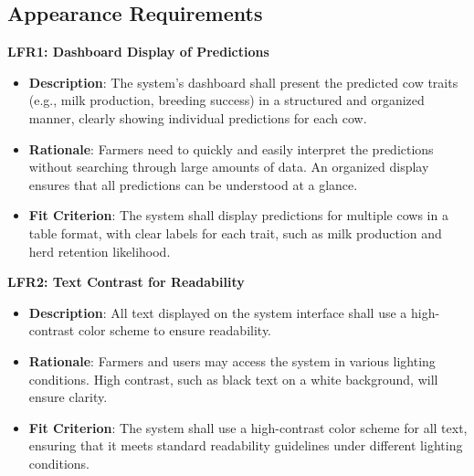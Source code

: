 \documentclass[12pt]{article}
\begin{document}
\subsection{Appearance Requirements}
\textbf{LFR1: Dashboard Display of Predictions}
\begin{itemize}
    \item \textbf{Description}: The system's dashboard shall present the 
    predicted cow traits (e.g., milk production, breeding success) in a 
    structured and organized manner, clearly showing individual predictions 
    for each cow.
    \item \textbf{Rationale}: Farmers need to quickly and easily interpret the 
    predictions without searching through large amounts of data. An organized 
    display ensures that all predictions can be understood at a glance.
    \item \textbf{Fit Criterion}: The system shall display predictions for 
    multiple cows in a table format, with clear labels for each trait, such 
    as milk production and herd retention likelihood.
\end{itemize}
\textbf{LFR2: Text Contrast for Readability}
\begin{itemize}
    \item \textbf{Description}: All text displayed on the system interface 
    shall use a high-contrast color scheme to ensure readability.
    \item \textbf{Rationale}: Farmers and users may access the system in 
    various lighting conditions. High contrast, such as black text on a 
    white background, will ensure clarity.
    \item \textbf{Fit Criterion}: The system shall use a high-contrast 
    color scheme for all text, ensuring that it meets standard readability 
    guidelines under different lighting conditions.
\end{itemize}
\end{document}
